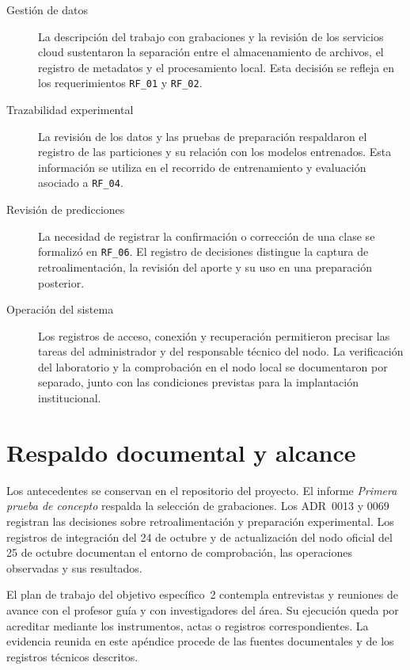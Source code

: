\begin{description}
    \item[Gestión de datos] La descripción del trabajo con grabaciones y la
    revisión de los servicios cloud sustentaron la separación entre el
    almacenamiento de archivos, el registro de metadatos y el procesamiento
    local. Esta decisión se refleja en los requerimientos \texttt{RF\_01} y
    \texttt{RF\_02}.

    \item[Trazabilidad experimental] La revisión de los datos y las pruebas
    de preparación respaldaron el registro de las particiones y su relación
    con los modelos entrenados. Esta información se utiliza en el recorrido
    de entrenamiento y evaluación asociado a \texttt{RF\_04}.

    \item[Revisión de predicciones] La necesidad de registrar la
    confirmación o corrección de una clase se formalizó en
    \texttt{RF\_06}. El registro de decisiones distingue la captura de
    retroalimentación, la revisión del aporte y su uso en una preparación
    posterior.

    \item[Operación del sistema] Los registros de acceso, conexión y
    recuperación permitieron precisar las tareas del administrador y del
    responsable técnico del nodo. La verificación del laboratorio y la
    comprobación en el nodo local se documentaron por separado, junto con
    las condiciones previstas para la implantación institucional.
\end{description}

\section{Respaldo documental y alcance}

Los antecedentes se conservan en el repositorio del proyecto. El informe
\emph{Primera prueba de concepto} respalda la selección de grabaciones.
Los ADR~0013 y 0069 registran las decisiones sobre retroalimentación y
preparación experimental. Los registros de integración del 24 de octubre y
de actualización del nodo oficial del 25 de octubre documentan el entorno
de comprobación, las operaciones observadas y sus resultados.

El plan de trabajo del objetivo específico~2 contempla entrevistas y
reuniones de avance con el profesor guía y con investigadores del área.
Su ejecución queda por acreditar mediante los instrumentos, actas o
registros correspondientes. La evidencia reunida en este apéndice procede
de las fuentes documentales y de los registros técnicos descritos.

